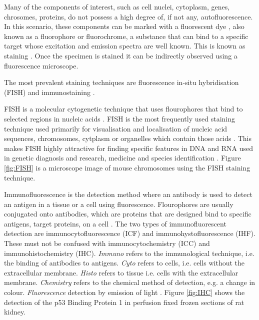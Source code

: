 Many of the components of interest, such as cell nuclei, cytoplasm, genes, chrosomes, proteins, do not possess a high degree of, if not any,  autofluorescence. 
In this scenario, these components can be marked with a fluorescent dye \citep{Tsien1998}, also known as a fluorophore or fluorochrome, a substance that can bind to a specific target whose excitation and emission spectra are well known. 
This is known as staining \citep{Danek2012,Hubeny2008,Dobrucki2013}. 
Once the specimen is stained it can be indirectly observed using a fluorescence microscope.

The most prevalent staining techniques are fluorescence in-situ hybridisation (FISH) and immunostaining \citep{Danek2012,Fatima2008,Kozubek2001_2,Theodosiou2007}.

\begin{definition}
	FISH is a molecular cytogenetic technique that uses flourophores that bind to selected regions in nucleic acids \citep{Danek2012,Fatima2008}.
	FISH is the most frequently used staining technique used primarily for visualisation and localisation of nucleic acid sequences, chromosomes, cytplasm or organelles which contain those acids \citep{Hubeny2008}.
	This makes FISH highly attractive for finding specific features in DNA and RNA used in genetic diagnosis and research, medicine and species identification \citep{Amann2008,Fatima2008}.
	Figure \ref{fig:FISH} is a microscope image of mouse chromosomes using the FISH staining technique.
\end{definition}

\begin{definition}[Immunostaining]
	Immunofluorescence is the detection method where an antibody is used to detect an antigen in a tissue or a cell using fluorescence. Flourophores are usually conjugated onto antibodies, which are proteins that are designed bind to specific antigens, target proteins, on a cell \citep{CudeBurke2014}.
	The two types of immunofluorescent detection are immunocytofluorescence (ICF) and immunohystofluorescence (IHF).
	These must not be confused with immunocytochemistry (ICC) and immunohistochemistry (IHC).
	\textit{Immuno} refers to the immunological technique, i.e. the binding of antibodies to antigens.
	\textit{Cyto} refers to cells, i.e. cells without the extracellular membrane.
	\textit{Histo} refers to tissue i.e. cells with the extracellular membrane.
	\textit{Chemistry} refers to the chemical method of detection, e.g. a change in colour.
	\textit{Fluorescence} detection by emission of light \citep{Katikireddy2011}.
	Figure \ref{fig:IHC} shows the detection of the p53 Binding Protein 1 in perfusion fixed frozen sections of rat kidney.
\end{definition}

